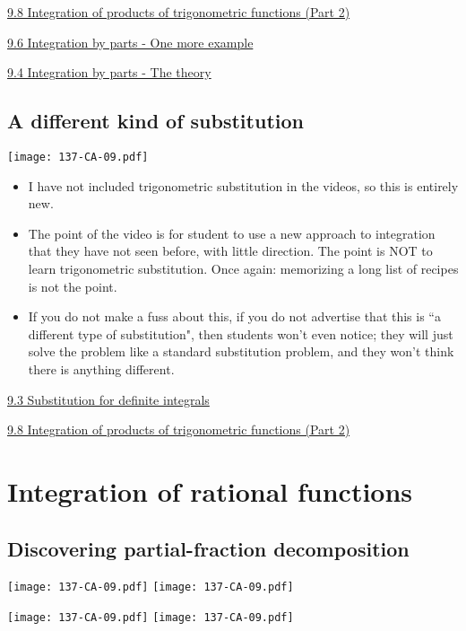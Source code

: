 \documentclass[11pt]{article}
\newcommand{\nl}{\hfill \vspace{-1.1\baselineskip}} %
\newcommand{\viii}{\hspace{8mm} \href{https://www.youtube.com/watch?v=9WkYb_fRoG0&list=PLlwePzQY_wW_DPAQSBjQmMs0hF8T7yVkF&index=3}{9.3 Substitution for definite integrals}}
\newcommand{\viv}{\hspace{8mm} \href{https://www.youtube.com/watch?v=taKIe3Ui3oI&list=PLlwePzQY_wW_DPAQSBjQmMs0hF8T7yVkF&index=4}{9.4 Integration by parts - The theory}}
\newcommand{\vvi}{\hspace{8mm} \href{https://www.youtube.com/watch?v=gR-chzRVpWo&list=PLlwePzQY_wW_DPAQSBjQmMs0hF8T7yVkF&index=6}{9.6 Integration by parts - One more example}}
\newcommand{\vviii}{\hspace{8mm} \href{https://www.youtube.com/watch?v=zrPCAP9-0wo&list=PLlwePzQY_wW_DPAQSBjQmMs0hF8T7yVkF&index=8}{9.8 Integration of products of trigonometric functions (Part 2)}}
\begin{document}
\begin{videos}
\vviii

\vvi

\viv
\end{videos}

\newpage
\subsection{A different kind of substitution}

\begin{center}
{ \texttt{[image: 137-CA-09.pdf]}} 
\end{center}

\begin{comments}
\nl
	\begin{itemize}
		\item I have not included trigonometric substitution in the videos, so this is entirely new.
		\item The point of the video is for student to use a new approach to integration that they have not seen before, with little direction.  The point is NOT to learn trigonometric substitution.   Once again: memorizing a long list of recipes is not the point.  
		\item If you do not make a fuss about this, if you do not advertise that this is ``a different type of substitution", then students won't even notice; they will just solve the problem like a standard substitution problem, and they won't think there is anything different.
	\end{itemize}
\end{comments}

\begin{videos}
\viii

\vviii
\end{videos}

\newpage
\section{Integration of rational functions}
\subsection{Discovering partial-fraction decomposition}

\begin{center}
{ \texttt{[image: 137-CA-09.pdf]}} \quad
{ \texttt{[image: 137-CA-09.pdf]}} 
\vspace{-.5cm}

{ \texttt{[image: 137-CA-09.pdf]}} \quad
{ \texttt{[image: 137-CA-09.pdf]}} 
\end{center}
\end{document}
